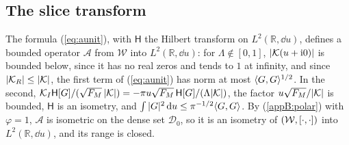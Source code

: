 \subsection{The slice transform}\label{appB:transform}

The formula (\ref{eq:aunit}), with $\mathsf H$ the Hilbert transform on $L^2(\mathbb R,\dd u)$, defines a bounded operator $\mathcal A$ from $\mathcal W$ into $L^2(\mathbb R,\dd u)$: for $\Lambda\notin[0,1]$, $|\mathcal K(u+\mathrm{i}0)|$ is bounded below, since it has no real zeros and tends to $1$ at infinity, and since $|\mathcal K_R|\le|\mathcal K|$, the first term of (\ref{eq:aunit}) has norm at most $\langle G,G\rangle^{1/2}$. In the second, $\mathcal K_I\mathsf H[G]/(\sqrt{F_M}\,|\mathcal K|)=-\pi u\sqrt{F_M}\,\mathsf H[G]/(\Lambda|\mathcal K|)$, the factor $u\sqrt{F_M}/|\mathcal K|$ is bounded, $\mathsf H$ is an isometry, and $\int|G|^2\,\mathrm{d} u\le\pi^{-1/2}\langle G,G\rangle$. By (\ref{appB:polar}) with $\varphi=1$, $\mathcal A$ is isometric on the dense set $\mathcal D_0$, so it is an isometry of $(\mathcal W,[\cdot,\cdot])$ into $L^2(\mathbb R,\dd u)$, and its range is closed.

